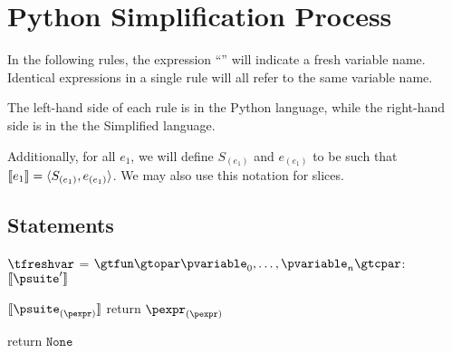 \documentclass{article}
\begin{document}
\section{Python Simplification Process}

In the following rules, the expression ``\tfreshvar'' will indicate a fresh variable name.
Identical expressions in a single rule will all refer to the same variable name.

The left-hand side of each rule is in the Python language, while the right-hand side is
in the the Simplified language.

Additionally, for all $e_1$, we will define $S_{(e_1)}$ and $e_{(e_1)}$ to be such
that $\meaningof{e_1} = \gsLR{S_{(e_1)}, e_{(e_1)}}$. We may also use this notation
for slices.

\subsection{Statements}

\newsavebox{\funcDefBox}
\begin{lrbox}{\funcDefBox}
\begin{python}
$\tfreshvar$ = $\gtfun \gtopar \pvariable_0, \ldots, \pvariable_n \gtcpar$:
  $\meaningof{\psuite'}$
\end{python}
\end{lrbox}

\begin{mathpar}
\end{mathpar}

\newsavebox{\returnBox}
\begin{lrbox}{\returnBox}
\begin{python}
$\meaningof{\psuite_{(\pexpr)}}$
return $\pexpr_{(\pexpr)}$
\end{python}
\end{lrbox}

\begin{mathpar}
\end{mathpar}

\newsavebox{\ereturnBox}
\begin{lrbox}{\ereturnBox}
\begin{python}
return $\mathtt{None}$
\end{python}
\end{lrbox}
\end{document}
